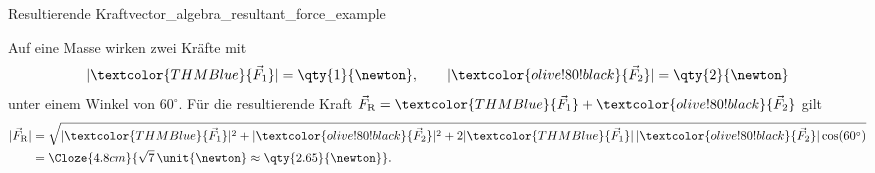 \begin{ExampleBox}{Resultierende Kraft}{vector_algebra_resultant_force_example}
  \noindent
  \begin{minipage}[c]{0.55\linewidth}
    Auf eine Masse wirken zwei Kräfte mit
    \[
      |\textcolor{THMBlue}{\vec F_1}|=\qty{1}{\newton},\qquad
      |\textcolor{olive!80!black}{\vec F_2}|=\qty{2}{\newton}
    \]
    unter einem Winkel von $60^\circ$. Für die resultierende Kraft
    $\vec F_{\mathrm R}=\textcolor{THMBlue}{\vec F_1}
      +\textcolor{olive!80!black}{\vec F_2}$ gilt
    \[
      \begin{aligned}
        |\vec F_{\mathrm R}|
        &=\sqrt{|\textcolor{THMBlue}{\vec F_1}|^2
          +|\textcolor{olive!80!black}{\vec F_2}|^2
          +2|\textcolor{THMBlue}{\vec F_1}|
          \,|\textcolor{olive!80!black}{\vec F_2}|\cos(60^\circ)}\\
        &=\Cloze{4.8cm}{\sqrt7\,\unit{\newton}
          \approx\qty{2.65}{\newton}}.
      \end{aligned}
    \]
  \end{minipage}\hfill
  \begin{minipage}[c]{0.41\linewidth}
    \centering
  \end{minipage}
\end{ExampleBox}
